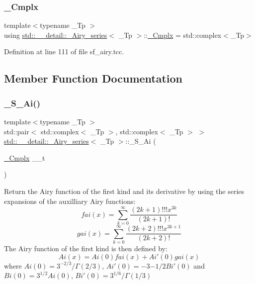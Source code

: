 \subsubsection{\texorpdfstring{\+\_\+\+Cmplx}{\_Cmplx}}
{\footnotesize\ttfamily template$<$typename \+\_\+\+Tp $>$ \\
using \hyperlink{classstd_1_1____detail_1_1__Airy__series}{std\+::\+\_\+\+\_\+detail\+::\+\_\+\+Airy\+\_\+series}$<$ \+\_\+\+Tp $>$\+::\hyperlink{classstd_1_1____detail_1_1__Airy__series_ab41161caa54609f4735987fbaed41d9d}{\+\_\+\+Cmplx} =  std\+::complex$<$\+\_\+\+Tp$>$}



Definition at line 111 of file sf\+\_\+airy.\+tcc.



\subsection{Member Function Documentation}
\mbox{\label{classstd_1_1____detail_1_1__Airy__series_a1de7c7a43d6080a2d666d0f1d7067199}} 
\subsubsection{\texorpdfstring{\+\_\+\+S\+\_\+\+Ai()}{\_S\_Ai()}}
{\footnotesize\ttfamily template$<$typename \+\_\+\+Tp $>$ \\
std\+::pair$<$ std\+::complex$<$ \+\_\+\+Tp $>$, std\+::complex$<$ \+\_\+\+Tp $>$ $>$ \hyperlink{classstd_1_1____detail_1_1__Airy__series}{std\+::\+\_\+\+\_\+detail\+::\+\_\+\+Airy\+\_\+series}$<$ \+\_\+\+Tp $>$\+::\+\_\+\+S\+\_\+\+Ai (\begin{DoxyParamCaption}\item[{\hyperlink{classstd_1_1____detail_1_1__Airy__series_ab41161caa54609f4735987fbaed41d9d}{\+\_\+\+Cmplx}}]{\+\_\+\+\_\+t }\end{DoxyParamCaption})\hspace{0.3cm}{\ttfamily [static]}}

Return the Airy function of the first kind and its derivative by using the series expansions of the auxilliary Airy functions\+: \[ fai(x) = \sum_{k=0}^\infty \frac{(2k+1)!!!x^{3k}}{(2k+1)!} \] \[ gai(x) = \sum_{k=0}^\infty \frac{(2k+2)!!!x^{3k+1}}{(2k+2)!} \] The Airy function of the first kind is then defined by\+: \[ Ai(x) = Ai(0)fai(x) + Ai'(0)gai(x) \] where $ Ai(0) = 3^{-2/3}/\Gamma(2/3) $, $ Ai'(0) = -3{-1/2}Bi'(0) $ and $ Bi(0) = 3^{1/2}Ai(0) $, $ Bi'(0) = 3^{1/6}/\Gamma(1/3) $


